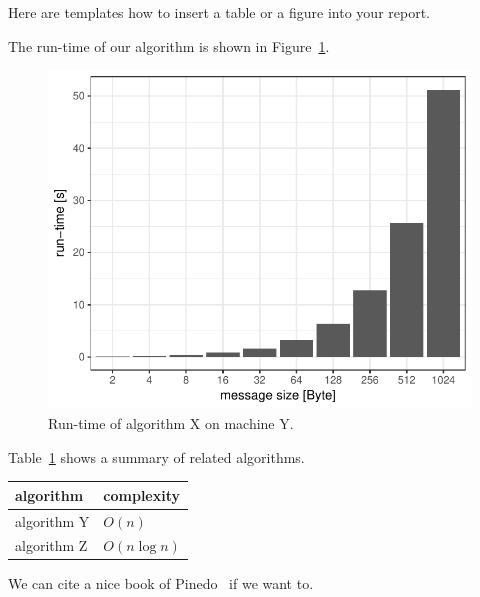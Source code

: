 Here are templates how to insert a table or a figure into your report.

The run-time of our algorithm is shown in Figure~\ref{fig:runtime}.

\begin{figure}[ht]
\centering
\includegraphics[width=.5\linewidth]{figures/runtime}
\caption{Run-time of algorithm X on machine Y.}
\label{fig:runtime}
\end{figure}


Table~\ref{tab:related_algorithms} shows a summary of related algorithms.

\begin{table}[ht]
\centering
{}
\label{tab:related_algorithms}
\begin{tabular}{ll}
\toprule 
algorithm & complexity \\
\midrule
algorithm Y & $O(n)$ \\
algorithm Z & $O(n \log{n} )$ \\
\bottomrule
\end{tabular}
\end{table}

We can cite a nice book of Pinedo~\cite{Pinedo:2008vs} if we want to.
